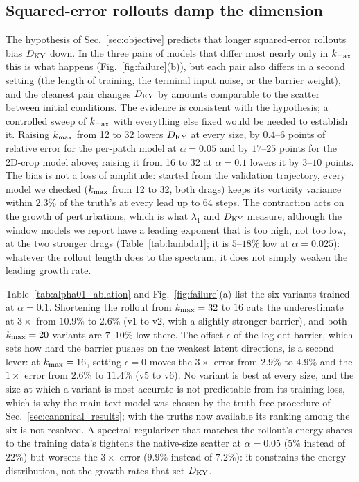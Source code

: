 \subsection{Squared-error rollouts damp the dimension}
\label{sec:fail_mse}

The hypothesis of Sec.~\ref{sec:objective} predicts that longer
squared-error rollouts bias $D_{\mathrm{KY}}$ down. In the three pairs of models
that differ most nearly only in $k_{\max}$ this is what happens
(Fig.~\ref{fig:failure}(b)), but each pair also differs in a second
setting (the length of training, the terminal input noise, or the
barrier weight), and the cleanest pair changes $D_{\mathrm{KY}}$ by amounts comparable
to the scatter between initial conditions. The evidence is consistent
with the hypothesis; a controlled sweep of $k_{\max}$ with everything else
fixed would be needed to establish it. Raising $k_{\max}$ from 12 to 32
lowers $D_{\mathrm{KY}}$ at every size, by $0.4$--$6$ points of relative error for the
per-patch model at $\alpha=0.05$ and by $17$--$25$ points for the 2D-crop
model above; raising it from 16 to 32 at $\alpha=0.1$ lowers it by $3$--$10$
points. The bias is not a loss of amplitude: started from the validation
trajectory, every model we checked ($k_{\max}$ from 12 to 32, both drags)
keeps its vorticity variance within $2.3\%$ of the truth's at every lead
up to 64 steps. The contraction acts on the growth of perturbations,
which is what $\lambda_1$ and $D_{\mathrm{KY}}$ measure, although the window models we
report have a leading exponent that is too high, not too low, at the two
stronger drags (Table~\ref{tab:lambda1}; it is $5$--$18\%$ low at $\alpha=0.025$): whatever the rollout length does to the
spectrum, it does not simply weaken the leading growth rate.

Table~\ref{tab:alpha01_ablation} and Fig.~\ref{fig:failure}(a) list the
six variants trained at $\alpha=0.1$. Shortening the rollout from
$k_{\max}=32$ to $16$ cuts the underestimate at $3\times$ from $10.9\%$ to
$2.6\%$ (v1 to v2, with a slightly stronger barrier), and both $k_{\max}=20$
variants are $7$--$10\%$ low there. The offset $\epsilon$ of the log-det
barrier, which sets how hard the barrier pushes on the weakest latent
directions, is a second lever: at $k_{\max}=16$, setting $\epsilon=0$ moves the
$3\times$ error from $2.9\%$ to $4.9\%$ and the $1\times$ error from $2.6\%$ to
$11.4\%$ (v5 to v6). No variant is best at every size, and the size at which a variant is most
accurate is not predictable from its training loss, which is why the
main-text model was chosen by the truth-free procedure of
Sec.~\ref{sec:canonical_results}; with the truths now available its
ranking among the six is not resolved. A spectral regularizer that matches the
rollout's energy shares to the training data's tightens the native-size
scatter at $\alpha=0.05$ ($5\%$ instead of $22\%$) but worsens the $3\times$
error ($9.9\%$ instead of $7.2\%$): it constrains the energy distribution,
not the growth rates that set $D_{\mathrm{KY}}$.


